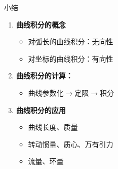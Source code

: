 \begin{frame}[<+->]{小结}
	\linespread{1.4}
	\begin{enumerate}
	  \item {\bf 曲线积分的概念}
	  \begin{itemize}
	    \item 对弧长的曲线积分：无向性
	    \item 对坐标的曲线积分：有向性
	  \end{itemize}
	  \item {\bf 曲线积分的计算：}
	  \begin{itemize}
	    \item 曲线参数化$\to$定限$\to$积分
	  \end{itemize}
	  \item {\bf 曲线积分的应用}
	  \begin{itemize}
	    \item 曲线长度、质量
	    \item 转动惯量、质心、万有引力
	    \item 流量、环量
	  \end{itemize}
	\end{enumerate}
\end{frame}


% 
